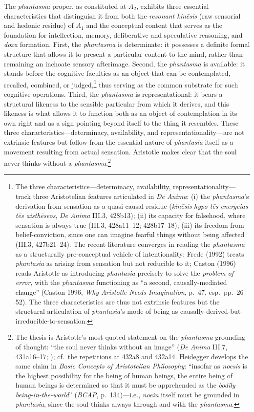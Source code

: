 The \textit{phantasma} proper, as constituted at $A_2$, exhibits three essential characteristics that distinguish it from both the \textit{resonant kinēsis} (raw sensorial and hedonic residue) of $A_1$ and the conceptual content that serves as the foundation for intellection, memory, deliberative and speculative reasoning, and \textit{doxa} formation. First, the \textit{phantasma} is determinate: it possesses a definite formal structure that allows it to present a particular content to the mind, rather than remaining an inchoate sensory afterimage. Second, the \textit{phantasma} is available: it stands before the cognitive faculties as an object that can be contemplated, recalled, combined, or judged,\footnote{The three characteristics---determinacy, availability, representationality---track three Aristotelian features articulated in \textit{De Anima}: (i) the \textit{phantasma}'s derivation from sensation as a quasi-causal residue (\textit{kinēsis} \textit{hypo tēs energeias tēs aisthēseos}, \textit{De Anima} III.3, 428b13); (ii) its capacity for falsehood, where sensation is always true (III.3, 428a11--12; 428b17--18); (iii) its freedom from belief-conviction, since one can imagine fearful things without being affected (III.3, 427b21--24). The recent literature converges in reading the \textit{phantasma} as a structurally pre-conceptual vehicle of intentionality: Frede (1992) treats \textit{phantasia} as arising from sensation but not reducible to it; Caston (1996) reads Aristotle as introducing \textit{phantasia} precisely to solve the \textit{problem of error}, with the \textit{phantasma} functioning as ``a second, causally-mediated change'' (Caston 1996, \textit{Why Aristotle Needs Imagination}, p.~47, esp.~pp.~26--52). The three characteristics are thus not extrinsic features but the structural articulation of \textit{phantasia}'s mode of being as causally-derived-but-irreducible-to-sensation.} thus serving as the common substrate for such cognitive operations. Third, the \textit{phantasma} is representational: it bears a structural likeness to the sensible particular from which it derives, and this likeness is what allows it to function both as an object of contemplation in its own right and as a sign pointing beyond itself to the thing it resembles. These three characteristics---determinacy, availability, and representationality---are not extrinsic features but follow from the essential nature of \textit{phantasia} itself as a movement resulting from actual sensation. Aristotle makes clear that the soul never thinks without a \textit{phantasma},\footnote{The thesis is Aristotle's most-quoted statement on the \textit{phantasma}-grounding of thought: ``the soul never thinks without an image'' (\textit{De Anima} III.7, 431a16--17; ); cf.~the repetitions at 432a8 and 432a14. Heidegger develops the same claim in \textit{Basic Concepts of Aristotelian Philosophy}: ``insofar as \textit{noesis} is the highest possibility for the being of human beings, the entire being of human beings is determined so that it must be apprehended as the \textit{bodily being-in-the-world}'' (\textit{BCAP}, p.~134)---i.e., \textit{noein} itself must be grounded in \textit{phantasia}, since the soul thinks always through and with the \textit{phantasma}.} 
